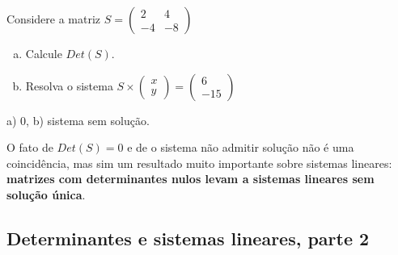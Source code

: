 \documentclass[main.tex]{subfiles}
\begin{document}
\begin{questao}
Considere a matriz $S=\begin{pmatrix}2 & 4 \\ -4 & -8\end{pmatrix}$
\begin{enumerate}[a)]
\item Calcule $Det(S)$.
\item Resolva o sistema $S \times \begin{pmatrix}x \\ y\end{pmatrix} = \begin{pmatrix}6 \\ -15\end{pmatrix}$
\end{enumerate}
\end{questao}

\begin{gabarito}
	\begin{gabaritoQuestao}
		a) $0$, b) sistema sem solução.
	\end{gabaritoQuestao}
\end{gabarito}

O fato de $Det(S)=0$ e de o sistema não admitir solução não é uma coincidência, mas sim um resultado muito importante sobre sistemas lineares: \textbf{matrizes com determinantes nulos levam a sistemas lineares sem solução única}.

\subsection*{Determinantes e sistemas lineares, parte 2}
\end{document}
